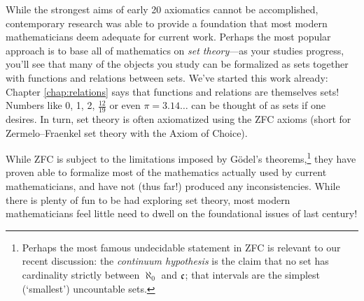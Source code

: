 While the strongest aims of early 20\th{} axiomatics cannot be accomplished, contemporary research was able to provide a foundation that most modern mathematicians deem adequate for current work. Perhaps the most popular approach is to base all of mathematics on \emph{set theory}---as your studies progress, you'll see that many of the objects you study can be formalized as sets together with functions and relations between sets. We've started this work already: Chapter \ref{chap:relations} says that functions and relations are themselves sets! Numbers like 0, 1, 2, $\frac{12}{19}$ or even $\pi=3.14\ldots$ can be thought of as sets if one desires. In turn, set theory is often axiomatized using the \textrm{ZFC} axioms (short for Zermelo--Fraenkel set theory with the Axiom of Choice).\smallbreak

While \textrm{ZFC} is subject to the limitations imposed by Gödel's theorems,\footnote{Perhaps the most famous undecidable statement in ZFC is relevant to our recent discussion: the \emph{continuum hypothesis} is the claim that no set has cardinality strictly between $\aleph_0$ and $\mathfrak{c}$; that intervals are the simplest (`smallest') uncountable sets.} they have proven able to formalize most of the mathematics actually used by current mathematicians, and have not (thus far!) produced any inconsistencies. While there is plenty of fun to be had exploring set theory,%
most modern mathematicians feel little need to dwell on the foundational issues of last century!



